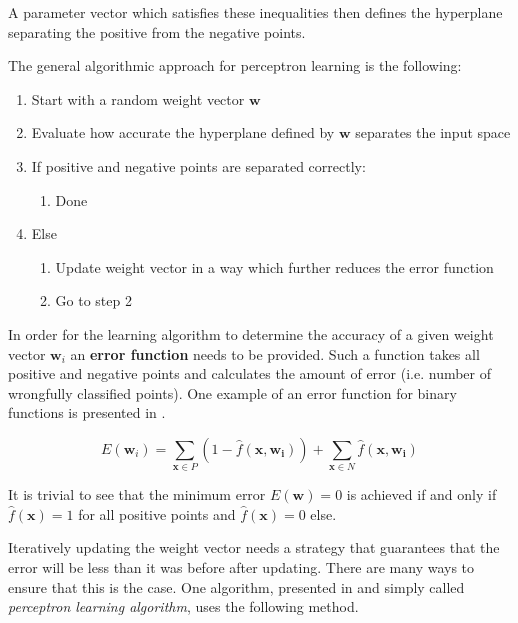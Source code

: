 A parameter vector which satisfies these inequalities then defines the hyperplane separating the positive from the negative points.

The general algorithmic approach for perceptron learning is the following:
\begin{enumerate}
    \item Start with a random weight vector $\bm{w}$
    \item Evaluate how accurate the hyperplane defined by $\bm{w}$ separates the input space
    \item If positive and negative points are separated correctly:
    \begin{enumerate}
        \item Done
    \end{enumerate}
    \item Else
    \begin{enumerate}
        \item Update weight vector in a way which further reduces the error function 
        \item Go to step 2
    \end{enumerate}
\end{enumerate}

In order for the learning algorithm to determine the accuracy of a given weight vector $\bm{w}_i$ an \textbf{error function} needs to be provided.
Such a function takes all positive and negative points and calculates the amount of error (i.e. number of wrongfully classified points).
One example of an error function for binary functions is presented in \cite{rojas_neural_1996}.

\begin{equation}
    \label{eq:error-binary}
    E(\bm{w}_i) = \sum_{\bm{x} \in P} (1 - \hat{f}(\bm{x},\bm{w_i})) + \sum_{\bm{x} \in N} \hat{f}(\bm{x},\bm{w_i})
\end{equation}

It is trivial to see that the minimum error $E(\bm{w}) = 0$ is achieved if and only if $\hat{f}(\bm{x}) = 1$ for all positive points and $\hat{f}(\bm{x}) = 0$ else.

Iteratively updating the weight vector needs a strategy that guarantees that the error will be less than it was before after updating.
There are many ways to ensure that this is the case.
One algorithm, presented in \cite{rojas_neural_1996} and simply called \textit{perceptron learning algorithm}, uses the following method.


